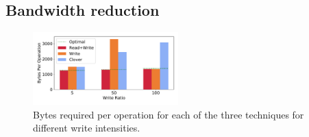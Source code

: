 



\subsection{Bandwidth reduction}

\begin{figure}
    \includegraphics[width=0.5\textwidth]{fig/bandwidth_reduction.pdf}
    \caption{Bytes required per operation for each of the three techniques for different write intensities.}
    \label{fig:bandwidth_reduction}
\end{figure}

